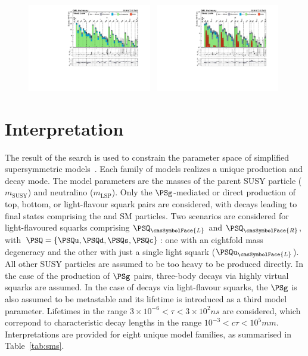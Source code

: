 \begin{figure}[!h]
  \includegraphics[width=0.48\textwidth, trim=10 0 60 10, clip=true]{Figures/5jet_cr-only.pdf}~
  \includegraphics[width=0.48\textwidth, trim=10 0 60 10, clip=true]{Figures/6jet_cr-only.pdf}\\
  \label{fig:result}
\end{figure}


\section{Interpretation}
\label{sec:interpretations}

The result of the search is used to constrain the parameter space of
simplified supersymmetric models~\cite{Alwall:2008ag, Alwall:2008va,
  sms}. Each family of models realizes a unique production and decay
mode. The model parameters are the masses of the parent SUSY particle
($m_\text{SUSY}$) and neutralino ($m_\text{LSP}$). Only the
$\PSg$-mediated or direct production of top, bottom, or light-flavour
squark pairs are considered, with decays leading to final states
comprising the \chiz and SM particles. Two scenarios are considered
for light-flavoured squarks comprising $\PSQ_\cmsSymbolFace{L}$ and
$\PSQ_\cmsSymbolFace{R}$, with $\PSQ = \{\PSQu, \PSQd, \PSQs,
\PSQc\}$: one with an eightfold mass degeneracy and the other with
just a single light squark (\eg $\PSQu_\cmsSymbolFace{L}$). All other
SUSY particles are assumed to be too heavy to be produced directly. In
the case of the production of $\PSg$ pairs, three-body decays via
highly virtual squarks are assumed. In the case of decays via
light-flavour squarks, the $\PSg$ is also assumed to be metastable and
its lifetime is introduced as a third model parameter. Lifetimes in
the range $3{\times}10^{-6} < \tau < 3{\times}10^{2}\unit{ns}$ are
considered, which correpond to characteristic decay lengths in the
range $10^{-3} < c\tau < 10^{5}\unit{mm}$. Interpretations are
provided for eight unique model families, as summarised in
Table~\ref{tab:sms}.

